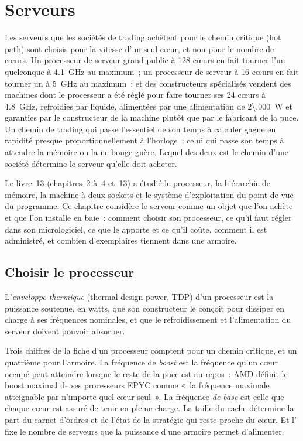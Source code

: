 \chapter{Serveurs}\label{ch:nw:servers}

Les serveurs que les sociétés de trading achètent pour le chemin critique (hot path) sont choisis pour la vitesse d'un seul cœur, et non pour le nombre de cœurs. Un processeur de serveur grand public
à 128 cœurs en fait tourner l'un quelconque à 4.1~GHz au maximum~; un processeur de serveur à 16 cœurs en fait tourner un à 5~GHz au maximum~;
et des constructeurs spécialisés vendent des machines dont le processeur a été réglé pour faire tourner ses 24 cœurs à 4.8~GHz, refroidies par liquide,
alimentées par une alimentation de \qty{2\,000}{\watt} et garanties par le constructeur de la machine plutôt que par le fabricant de la puce. Un chemin de trading qui passe l'essentiel de son temps
à calculer gagne en rapidité presque proportionnellement à l'horloge~; celui qui passe son temps à attendre la mémoire ou la  ne bouge guère.
Lequel des deux est le chemin d'une société détermine le serveur qu'elle doit acheter.

Le livre~13 (chapitres~2 à~4 et~13) a étudié le processeur, la hiérarchie de mémoire, la machine à deux sockets et le système d'exploitation
du point de vue du programme. Ce chapitre considère le serveur comme un objet que l'on achète et que l'on installe en baie~: comment choisir son processeur, ce qu'il faut régler
dans son micrologiciel, ce que le  apporte et ce qu'il coûte, comment il est administré, et combien d'exemplaires tiennent dans une armoire.

\section{Choisir le processeur}

\begin{definition}\label{def:nw:servers:tdp}
L'\emph{enveloppe thermique} (thermal design power, TDP) d'un processeur est la puissance soutenue, en watts, que son constructeur
le conçoit pour dissiper en charge à ses fréquences nominales, et que le refroidissement et l'alimentation du serveur doivent pouvoir absorber.
\end{definition}

Trois chiffres de la fiche d'un processeur comptent pour un chemin critique, et un quatrième pour l'armoire. La fréquence de \emph{boost} est la
fréquence qu'un cœur occupé peut atteindre lorsque le reste de la puce est au repos~: AMD définit le boost maximal de ses processeurs EPYC comme «~la
fréquence maximale atteignable par n'importe quel cœur seul~». La fréquence \emph{de base} est celle que chaque cœur est assuré de tenir en pleine charge. La taille du cache
détermine la part du carnet d'ordres et de l'état de la stratégie qui reste proche du cœur. Et l' fixe le nombre de serveurs
que la puissance d'une armoire permet d'alimenter.

